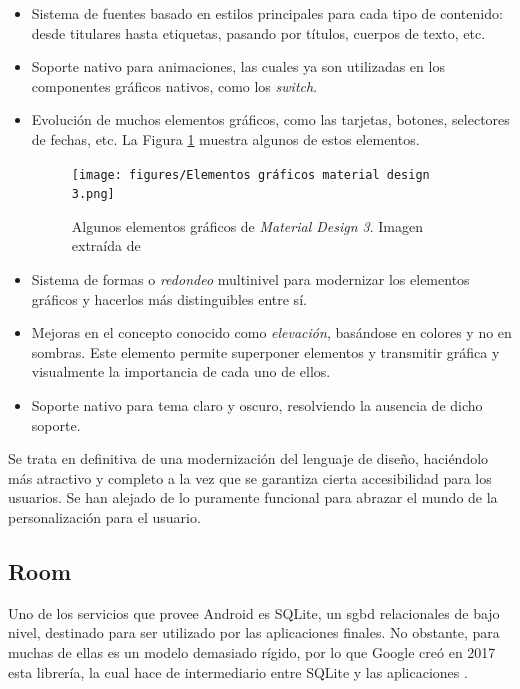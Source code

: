 \begin{itemize}
            \item Sistema de fuentes basado en estilos principales para cada tipo de contenido: desde titulares hasta etiquetas, pasando por títulos, cuerpos de texto, etc.
            \item Soporte nativo para animaciones, las cuales ya son utilizadas en los componentes gráficos nativos, como los \textit{switch}.
            \item Evolución de muchos elementos gráficos, como las tarjetas, botones, selectores de fechas, etc. La Figura \ref{figure:material_design_3:elementos_graficos} muestra algunos de estos elementos.
                \begin{figure}[h]
                    \centering
                    \texttt{[image: figures/Elementos gráficos material design 3.png]}
                    \caption[Algunos elementos gráficos de \textit{Material Design 3}]
                    {Algunos elementos gráficos de \textit{Material Design 3}. Imagen extraída de \cite{cerda_material_2022}}
                    \label{figure:material_design_3:elementos_graficos}
                \end{figure}
            \item Sistema de formas o \textit{redondeo} multinivel para modernizar los elementos gráficos y hacerlos más distinguibles entre sí.
            \item Mejoras en el concepto conocido como \textit{elevación}, basándose en colores y no en sombras. Este elemento permite superponer elementos y transmitir gráfica y visualmente la importancia de cada uno de ellos.
            \item Soporte nativo para tema claro y oscuro, resolviendo la ausencia de dicho soporte.
        \end{itemize}

        Se trata en definitiva de una modernización del lenguaje de diseño, haciéndolo más 
        atractivo y completo a la vez que se garantiza cierta accesibilidad para los usuarios. Se han alejado de lo puramente funcional para abrazar el mundo de la personalización para el usuario.

    \subsection{Room}
        Uno de los servicios que provee Android es SQLite, un \gls{sgbd} relacionales de bajo nivel, destinado para ser utilizado por las aplicaciones finales. No obstante, para muchas de ellas es un modelo demasiado rígido, por lo que Google creó en 2017 esta librería, la cual hace de intermediario entre SQLite y las aplicaciones \cite{leiva_room_2020}. 
        
